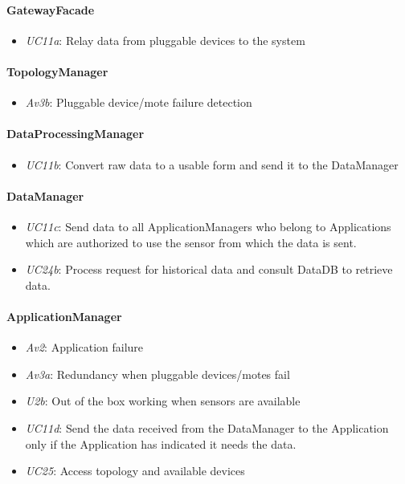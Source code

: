 \documentclass[english]{sareport}
\begin{document}
\paragraph{GatewayFacade}
\begin{itemize}
	\item \emph{UC11a}: Relay data from pluggable devices to the system
\end{itemize}

\paragraph{TopologyManager}
\begin{itemize}
	\item \emph{Av3b}: Pluggable device/mote failure detection
\end{itemize}

\paragraph{DataProcessingManager}
\begin{itemize}
	\item \emph{UC11b}: Convert raw data to a usable form and send it to the DataManager
\end{itemize}

\paragraph{DataManager}
\begin{itemize}
	\item \emph{UC11c}: Send data to all ApplicationManagers who belong to Applications which are authorized to use the sensor from which the data is sent.
	\item \emph{UC24b}: Process request for historical data and consult DataDB to retrieve data.
\end{itemize}

\paragraph{ApplicationManager}
\begin{itemize}
	\item \emph{Av2}: Application failure
	\item \emph{Av3a}: Redundancy when pluggable devices/motes fail
	\item \emph{U2b}: Out of the box working when sensors are available
	\item \emph{UC11d}: Send the data received from the DataManager to the Application only if the Application has indicated it needs the data.
	\item \emph{UC25}: Access topology and available devices
\end{itemize}
\end{document}
